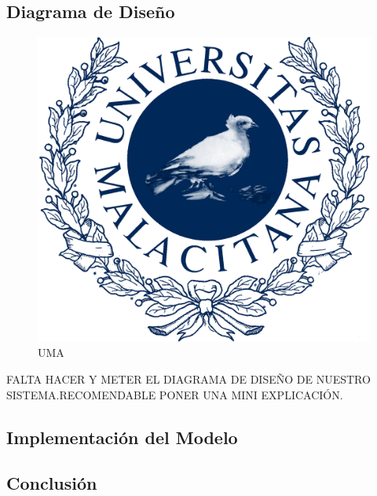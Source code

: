 \subsection{Diagrama de Diseño}

\begin{figure}[H]
    \centering
     \includegraphics[width=1\linewidth]{assets/umaLogo.png}
     \caption{UMA}
\end{figure}
FALTA HACER Y METER EL DIAGRAMA DE DISEÑO DE NUESTRO SISTEMA.RECOMENDABLE PONER UNA MINI EXPLICACIÓN.

\newpage



\subsection{Implementación del Modelo}


\subsection{Conclusión}

